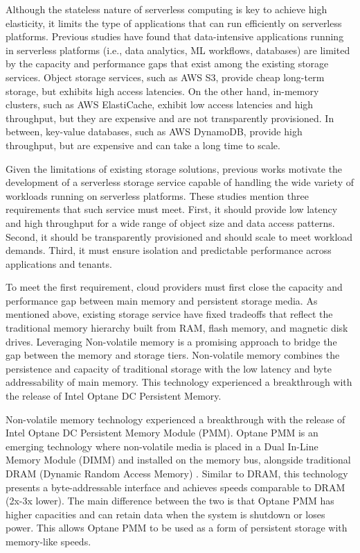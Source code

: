 Although the stateless nature of serverless computing is key to achieve high elasticity, it limits the type of applications that can run efficiently on serverless platforms. Previous studies \cite{jonas2019cloud} have found that data-intensive applications running in serverless platforms (i.e., data analytics, ML workflows, databases) are limited by the capacity and performance gaps that exist among the existing storage services. Object storage services, such as AWS S3, provide cheap long-term storage, but exhibits high access latencies. On the other hand, in-memory clusters, such as AWS ElastiCache, exhibit low access latencies and high throughput, but they are expensive and are not transparently provisioned. In between, key-value databases, such as AWS DynamoDB, provide high throughput, but are expensive and can take a long time to scale.

Given the limitations of existing storage solutions, previous works motivate the development of a serverless storage service capable of handling the wide variety of workloads running on serverless platforms. These studies mention three requirements that such service must meet. First, it should provide low latency and high throughput for a wide range of object size and data access patterns. Second, it should be transparently provisioned and should scale to meet workload demands. Third, it must ensure isolation and predictable performance across applications and tenants.

To meet the first requirement, cloud providers must first close the capacity and performance gap between main memory and persistent storage media. As mentioned above, existing storage service have fixed tradeoffs that reflect the traditional memory hierarchy built from RAM, flash memory, and magnetic disk drives. Leveraging Non-volatile memory is a promising approach to bridge the gap between the memory and storage tiers. Non-volatile memory combines the persistence and capacity of traditional storage with the low latency and byte addressability of main memory. This technology experienced a breakthrough with the release of Intel Optane DC Persistent Memory.

Non-volatile memory technology experienced a breakthrough with the release of Intel Optane DC Persistent Memory Module (PMM). Optane PMM is an emerging technology where non-volatile media is placed in a Dual In-Line Memory Module (DIMM) and installed on the memory bus, alongside traditional DRAM (Dynamic Random Access Memory) \cite{WhatisIn60:online}. Similar to DRAM, this technology presents a byte-addressable interface and achieves speeds comparable to DRAM (2x-3x lower). The main difference between the two is that Optane PMM has higher capacities and can retain data when the system is shutdown or loses power. This allows Optane PMM to be used as a form of persistent storage with memory-like speeds.


